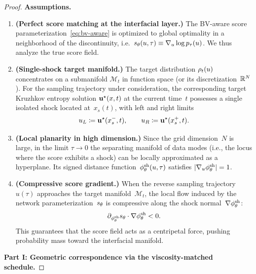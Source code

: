 \begin{proof}

\noindent\textbf{Assumptions.}

\begin{enumerate}
\item \textbf{(Perfect score matching at the interfacial layer.)}
  The BV-aware score parameterization~\eqref{eq:bv-aware} is optimized to global optimality
  in a neighborhood of the discontinuity, i.e.\ $s_{\theta}(u,\tau) \equiv \nabla_u \log p_{\tau}(u)$.
  We thus analyze the true score field.

\item \textbf{(Single-shock target manifold.)}
  The target distribution $\rho_{t}(u)$ concentrates on a submanifold $\mathcal{M}_{t}$
  in function space (or its discretization~$\mathbb{R}^{N}$).%
  For the sampling trajectory under consideration, the corresponding target
  Kruzhkov entropy solution $\mathbf{u}^{\star}(x,t)$ at the current time~$t$ possesses a single
  isolated shock located at~$x_{s}(t)$, with left and right limits
  \begin{equation}
  u_{L} \coloneqq \mathbf{u}^{\star}(x_{s}^{-},t), \qquad
  u_{R} \coloneqq \mathbf{u}^{\star}(x_{s}^{+},t).
  \end{equation}

\item \textbf{(Local planarity in high dimension.)}
  Since the grid dimension~$N$ is large, in the limit $\tau\to0$ the separating
  manifold of data modes (i.e., the locus where the score exhibits a shock) can be
  locally approximated as a hyperplane.
  Its signed distance function~$\phi^{\mathrm{sh}}_{\theta}(u,\tau)$ satisfies
  $\lvert \nabla_u \phi^{\mathrm{sh}}_{\theta} \rvert = 1$.

\item \textbf{(Compressive score gradient.)}
  When the reverse sampling trajectory $u(\tau)$ approaches the target
  manifold~$\mathcal{M}_{t}$, the local flow induced by the network
  parameterization~$s_{\theta}$ is compressive along the shock
  normal~$\nabla\phi^{\mathrm{sh}}_{\theta}$:
  \begin{equation}
  \partial_{\phi^{\mathrm{sh}}_{\theta}} s_{\theta} \cdot \nabla\phi^{\mathrm{sh}}_{\theta} < 0.
  \end{equation}
  This guarantees that the score field acts as a centripetal force, pushing
  probability mass toward the interfacial manifold.
\end{enumerate}

\medskip
\noindent\textbf{Part I: Geometric correspondence via the viscosity-matched schedule.}


\end{proof}

